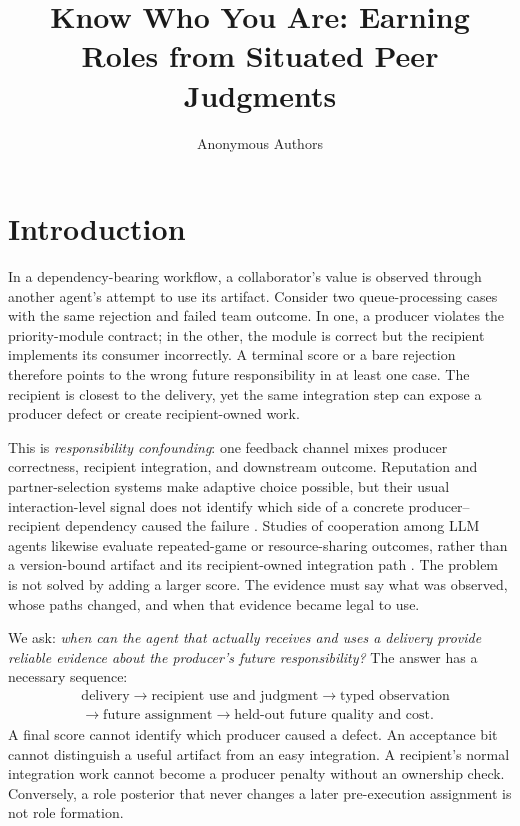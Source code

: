 \documentclass[sigconf,anonymous]{aamas}
\title[Know Who You Are]{Know Who You Are: Earning Roles from Situated Peer Judgments}
\author{Anonymous Authors}
\affiliation{\institution{Internal research draft}}
\begin{document}
\maketitle

\section{Introduction}

In a dependency-bearing workflow, a collaborator's value is observed through another agent's attempt to use its artifact. Consider two queue-processing cases with the same rejection and failed team outcome. In one, a producer violates the priority-module contract; in the other, the module is correct but the recipient implements its consumer incorrectly. A terminal score or a bare rejection therefore points to the wrong future responsibility in at least one case. The recipient is closest to the delivery, yet the same integration step can expose a producer defect or create recipient-owned work.

This is \emph{responsibility confounding}: one feedback channel mixes producer correctness, recipient integration, and downstream outcome. Reputation and partner-selection systems make adaptive choice possible, but their usual interaction-level signal does not identify which side of a concrete producer--recipient dependency caused the failure \cite{sabater2002reputation,pinyol2013trust,leung2024partner,leung2025partner,russell2026partner}. Studies of cooperation among LLM agents likewise evaluate repeated-game or resource-sharing outcomes, rather than a version-bound artifact and its recipient-owned integration path \cite{piatti2024cooperate,akata2025repeated}. The problem is not solved by adding a larger score. The evidence must say what was observed, whose paths changed, and when that evidence became legal to use.

We ask: \emph{when can the agent that actually receives and uses a delivery provide reliable evidence about the producer's future responsibility?} The answer has a necessary sequence:
\begin{equation}
\begin{aligned}
&\text{delivery}\rightarrow\text{recipient use and judgment}\rightarrow\text{typed observation}\\
&\rightarrow\text{future assignment}\rightarrow\text{held-out future quality and cost}.
\end{aligned}
\label{eq:story}
\end{equation}
A final score cannot identify which producer caused a defect. An acceptance bit cannot distinguish a useful artifact from an easy integration. A recipient's normal integration work cannot become a producer penalty without an ownership check. Conversely, a role posterior that never changes a later pre-execution assignment is not role formation.
\end{document}
